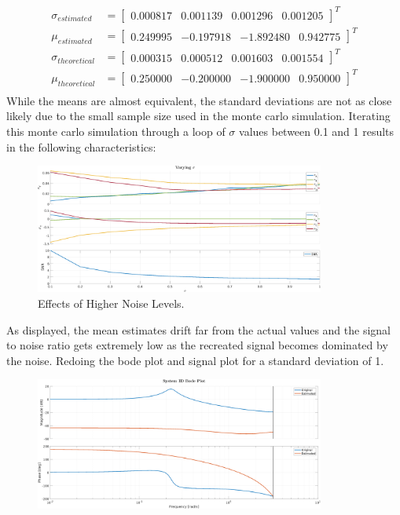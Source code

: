 \documentclass[11pt]{article}
\begin{document}
\begin{enumerate}[label=\textbf{\arabic*.}]
\begin{equation*}
\begin{split}
      \sigma_{estimated} &= \begin{bmatrix} 0.000817 & 0.001139 & 0.001296 & 0.001205 \end{bmatrix}^T \\
      \mu_{estimated} &= \begin{bmatrix} 0.249995 & -0.197918 & -1.892480 & 0.942775 \end{bmatrix}^T \\
      \sigma_{theoretical} &= \begin{bmatrix} 0.000315 & 0.000512 & 0.001603 & 0.001554 \end{bmatrix}^T \\
      \mu_{theoretical} &= \begin{bmatrix} 0.250000 & -0.200000 & -1.900000 & 0.950000 \end{bmatrix}^T \\
    \end{split}
  \end{equation*}
  While the means are almost equivalent, the standard deviations are not as close 
  likely due to the small sample size used in the monte carlo simulation. 
  Iterating this monte carlo simulation through a loop of $\sigma$ values 
  between 0.1 and 1 results in the following characteristics:
  \begin{figure}[H]
    \centering
    \includegraphics[width=0.85\textwidth]{4d.png}
    \caption{Effects of Higher Noise Levels.}
  \end{figure}
  As displayed, the mean estimates drift far from the actual values and the 
  signal to noise ratio gets extremely low as the recreated signal becomes 
  dominated by the noise. Redoing the bode plot and signal plot for a standard 
  deviation of 1.
  \begin{figure}[H]
    \centering
    \includegraphics[width=0.85\textwidth]{4e.png}

\end{figure}
\end{enumerate}
\end{document}
